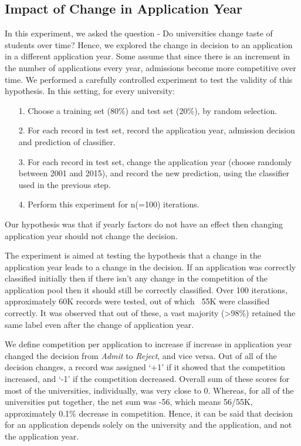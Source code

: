 \documentclass{sig-alternate-05-2015}
\begin{document}
\subsection{Impact of Change in Application Year}
\label{subsec:year-change-exp}
In this experiment, we asked the question - Do universities change taste of students over time? Hence, we explored the change in decision to an application in a different application year. Some assume that since there is an increment in the number of applications every year, admissions become more competitive over time. We performed a carefully controlled experiment to test the validity of this hypothesis. In this setting, for every university:
\begin{itemize}
\item[1.]Choose a training set (80\%) and test set (20\%), by random selection.
\item[2.]For each record in test set, record the application year, admission decision and prediction of classifier.
\item[3.]For each record in test set, change the application year (choose randomly between 2001 and 2015), and record the new prediction, using the classifier used in the previous step.
\item[4.]Perform this experiment for n(=100) iterations.
\end{itemize}
Our hypothesis was that if yearly factors do not have an effect then changing application year should not change the decision.

The experiment is aimed at testing the hypothesis that a change in the application year leads to a change in the decision. If an application was correctly classified initially then if there isn't any change in the competition of the application pool then it should still be correctly classified. Over 100 iterations, approximately 60K records were tested, out of which ~55K were classified correctly. It was observed that out of these, a vast majority (>98\%) retained the same label even after the change of application year.

We define competition per application to increase if increase in application year changed the decision from \textit{Admit} to \textit{Reject}, and vice versa. Out of all of the decision changes, a record was assigned `+1' if it showed that the competition increased, and `-1' if the competition decreased. Overall sum of these scores for most of the universities, individually, was very close to 0. Whereas, for all of the universities put together, the net sum was -56, which means 56/55K, approximately 0.1\% decrease in competition. Hence, it can be said that decision for an application depends solely on the university and the application, and not the application year.
\end{document}
